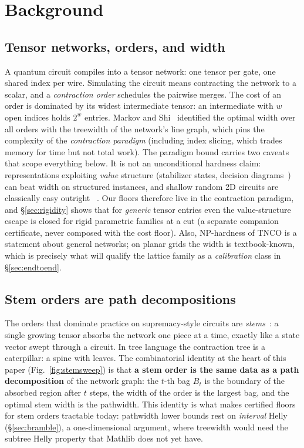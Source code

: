 \documentclass[sigplan,10pt,screen,review,anonymous]{acmart}
\begin{document}
\section{Background}\label{sec:background}

\subsection{Tensor networks, orders, and width}
A quantum circuit compiles into a tensor network: one tensor per gate, one shared index per
wire. Simulating the circuit means contracting the network to a scalar, and a
\emph{contraction order} schedules the pairwise merges. The cost of an order is dominated by
its widest intermediate tensor: an intermediate with $w$ open indices holds $2^w$ entries.
Markov and Shi~\cite{markov2008simulating} identified the optimal width over all orders with
the treewidth of the network's line graph, which pins the complexity of the
\emph{contraction paradigm} (including index slicing, which trades memory for time but not
total work). The paradigm bound carries two caveats that scope everything below. It is not an
unconditional hardness claim: representations exploiting \emph{value} structure
(stabilizer states, decision diagrams~\cite{dd2025treewidth}) can beat width on structured
instances, and shallow random 2D circuits are classically easy outright%
~\cite{napp2022efficient}. Our floors therefore live in the contraction paradigm, and
\S\ref{sec:rigidity} shows that for \emph{generic} tensor entries even the value-structure
escape is closed for rigid parametric families at a cut (a separate companion certificate,
never composed with the cost floor). Also, NP-hardness of TNCO is a statement about general networks; on
planar grids the width is textbook-known, which is precisely what will qualify the
lattice family as a \emph{calibration} class in \S\ref{sec:endtoend}.

\subsection{Stem orders are path decompositions}
The orders that dominate practice on supremacy-style circuits are
\emph{stems}~\cite{huang2020classical}: a single growing tensor absorbs the network one
piece at a time, exactly like a state vector swept through a circuit. In tree language the
contraction tree is a caterpillar: a spine with leaves. The combinatorial identity at
the heart of this paper (Fig.~\ref{fig:stemsweep}) is that \textbf{a stem order is the same
data as a path decomposition} of the network graph: the $t$-th bag $B_t$ is the boundary of
the absorbed region after $t$ steps, the width of the order is the largest bag, and the
optimal stem width is the pathwidth. This identity is what makes certified floors for stem
orders tractable today: pathwidth lower bounds rest on \emph{interval} Helly
(\S\ref{sec:bramble}), a one-dimensional argument, where treewidth would need the subtree
Helly property that Mathlib does not yet have.
\end{document}
